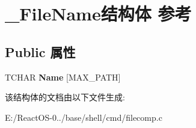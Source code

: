 \hypertarget{struct___file_name}{}\section{\+\_\+\+File\+Name结构体 参考}
\label{struct___file_name}
\subsection*{Public 属性}
\begin{DoxyCompactItemize}
\item 
\mbox{\label{struct___file_name_a907650b1581c4abb628a52d32569818a}} 
T\+C\+H\+AR {\bfseries Name} \mbox{[}M\+A\+X\+\_\+\+P\+A\+TH\mbox{]}
\end{DoxyCompactItemize}


该结构体的文档由以下文件生成\+:\begin{DoxyCompactItemize}
\item 
E\+:/\+React\+O\+S-\/0../base/shell/cmd/filecomp.\+c\end{DoxyCompactItemize}
